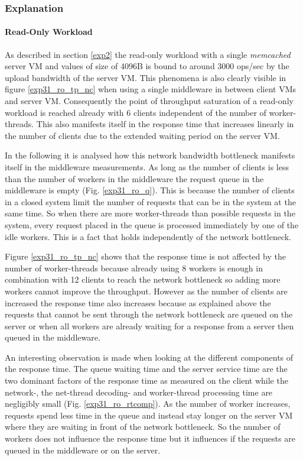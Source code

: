 \documentclass[report.tex]{subfiles}
\begin{document}
\subsubsection{Explanation}

\paragraph{Read-Only Workload}


As described in section \ref{exp2} the read-only workload with a single \emph{memcached} server VM and values of size of 4096B is bound to around 3000 ops/sec by the upload bandwidth of the server VM. This phenomena is also clearly visible in figure \ref{exp31_ro_tp_nc} when using a single middleware in between client VMs and server VM. Consequently the point of throughput saturation of a read-only workload is reached already with 6 clients independent of the number of worker-threads. This also manifests itself in the response time that increases linearly in the number of clients due to the extended waiting period on the server VM.

In the following it is analysed how this network bandwidth bottleneck manifests itself in the middleware measurements. 
As long as the number of clients is less than the number of workers in the middleware the request queue in the middleware is empty (Fig. \ref{exp31_ro_q}). This is because the number of clients in a closed system limit the number of requests that can be in the system at the same time. 
So when there are more worker-threads than possible requests in the system, every request placed in the queue is processed immediately by one of the idle workers. This is a fact that holds independently of the network bottleneck. 

Figure \ref{exp31_ro_tp_nc} shows that the response time is not affected by the number of worker-threads because already using 8 workers is enough in combination with 12 clients to reach the network bottleneck so adding more workers cannot improve the throughput. 
However as the number of clients are increased the response time also increases because as explained above the requests that cannot be sent through the network bottleneck are queued on the server or when all workers are already waiting for a response from a server then queued in the middleware.

An interesting observation is made when looking at the different components of the response time.
The queue waiting time and the server service time are the two dominant factors of the response time as measured on the client while the network-, the net-thread decoding- and worker-thread processing time are negligibly small  (Fig. \ref{exp31_ro_rtcomp}). As the number of worker increases, requests spend less time in the queue and instead stay longer on the server VM where they are waiting in front of the network bottleneck. 
So the number of workers does not influence the response time but it influences if the requests are queued in the middleware or on the server.
\end{document}

